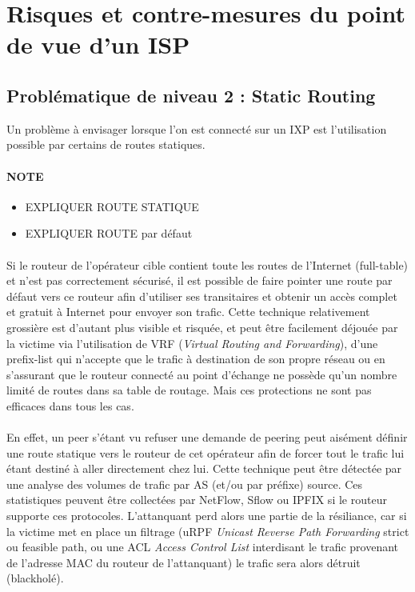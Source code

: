 \section{Risques et contre-mesures du point de vue d'un ISP}

\subsection{Problématique de niveau 2 : Static Routing}
Un problème à envisager lorsque l'on est connecté sur un IXP est l’utilisation possible par certains de routes statiques. 

\paragraph{NOTE}
\begin{itemize}
\item EXPLIQUER ROUTE STATIQUE
\item EXPLIQUER ROUTE par défaut
\end{itemize}

\paragraph{}
Si le routeur de l'opérateur cible contient toute les routes de l'Internet (full-table) et n'est pas correctement sécurisé, il est possible de faire pointer une route par défaut vers ce routeur afin d’utiliser ses transitaires et obtenir un accès complet et gratuit à Internet pour envoyer son trafic. Cette technique relativement grossière est d'autant plus visible et risquée, et peut être facilement déjouée par la victime via l'utilisation de VRF (\emph{Virtual Routing and Forwarding}), d'une prefix-list qui n'accepte que le trafic à destination de son propre réseau ou en s'assurant que le routeur connecté au point d'échange ne possède qu'un nombre limité de routes dans sa table de routage. Mais ces protections ne sont pas efficaces dans tous les cas.

\paragraph{}
En effet, un peer s'étant vu refuser une demande de peering peut aisément définir une route statique vers le routeur de cet opérateur afin de forcer tout le trafic lui étant destiné à aller directement chez lui. Cette technique peut être détectée par une analyse des volumes de trafic par AS (et/ou par préfixe) source. Ces statistiques peuvent être collectées par NetFlow, Sflow ou IPFIX si le routeur supporte ces protocoles. L'attanquant perd alors une partie de la résiliance, car si la victime met en place un filtrage (uRPF \emph{Unicast Reverse Path Forwarding} strict ou feasible path, ou une ACL \emph{Access Control List} interdisant le trafic provenant de l'adresse MAC du routeur de l'attanquant) le trafic sera alors détruit (blackholé).

